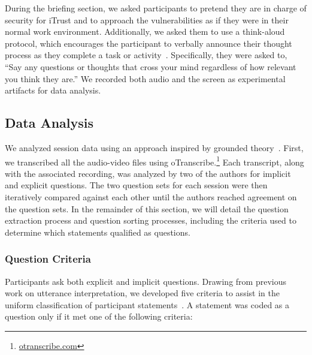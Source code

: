 \documentclass{acm_proc_article-sp}
\begin{document}
During the briefing section, we asked participants to pretend they are in charge of security for iTrust and to approach the vulnerabilities as if they were in their normal work environment.
Additionally, we asked them to use a think-aloud protocol, which encourages the participant to verbally announce their thought process as they complete a task or activity~\cite{nielsen2002getting}. 
Specifically, they were asked to, ``Say any questions or thoughts that cross your mind regardless of how relevant you think they are.''
We recorded both audio and the screen as experimental artifacts for data analysis.


\subsection{Data Analysis}
\label{dataAnalysis}
We analyzed session data using an approach inspired by grounded theory~\cite{glaser2009discovery}. 
First, we transcribed all the audio-video files using oTranscribe.\footnote{\url{otranscribe.com}}
Each transcript, along with the associated recording, was analyzed by two of the authors for implicit and explicit questions. 
The two question sets for each session were then iteratively compared against each other until the authors reached agreement on the question sets. 
In the remainder of this section, we will detail the question extraction process and question sorting processes, including the criteria used to determine which statements qualified as questions.
\subsubsection{Question Criteria}
Participants ask both explicit and implicit questions. 
Drawing from previous work on utterance interpretation, we developed five criteria to assist in the uniform classification of participant statements~\cite{letovsky1987cognitive}. 
A statement was coded as a question only if it met one of the following criteria:
\end{document}
